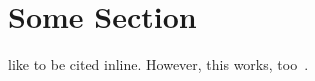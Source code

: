 \documentclass{article}
\begin{document}
\section{Some Section}
\Textcite{bertram} like to be cited inline.
However, this works, too~\cite{averroes/hercz}.

\printbibliography[title={My Refs}]
\end{document}
